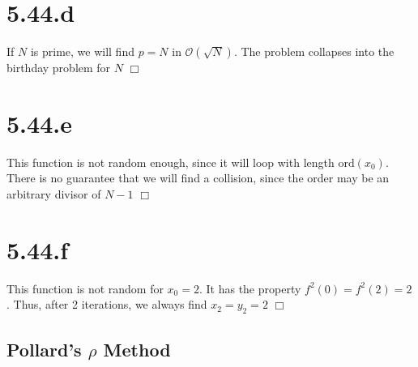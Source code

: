 \documentclass{article}
\begin{document}
\section*{5.44.d}
If $N$ is prime, we will find $p = N$ in $\mathcal{O}(\sqrt{N})$. The problem collapses into the birthday problem for $N$ $\Box$

\section*{5.44.e}
This function is not random enough, since it will loop with length $\mathrm{ord}(x_0)$. There is no guarantee that we will find a collision, since the order may be an arbitrary divisor of $N-1$ $\Box$

\section*{5.44.f}
This function is not random for $x_0 = 2$. It has the property $f^2(0) = f^2(2) = 2$. Thus, after 2 iterations, we always find $x_2 = y_2 = 2$ $\Box$ 

\newpage
\begin{appendices}
\section{Pollard's $\rho$ Method}

\end{appendices}
\end{document}
